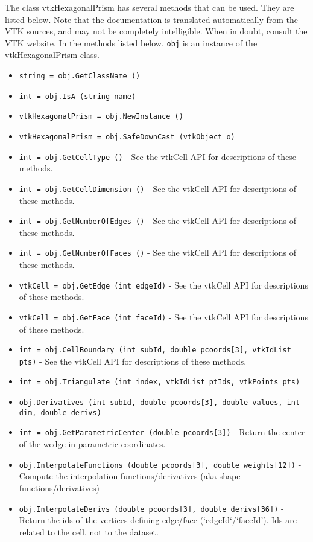 The class vtkHexagonalPrism has several methods that can be used.
  They are listed below.
Note that the documentation is translated automatically from the VTK sources,
and may not be completely intelligible.  When in doubt, consult the VTK website.
In the methods listed below, \verb|obj| is an instance of the vtkHexagonalPrism class.
\begin{itemize}
\item  \verb|string = obj.GetClassName ()|

\item  \verb|int = obj.IsA (string name)|

\item  \verb|vtkHexagonalPrism = obj.NewInstance ()|

\item  \verb|vtkHexagonalPrism = obj.SafeDownCast (vtkObject o)|

\item  \verb|int = obj.GetCellType ()| -  See the vtkCell API for descriptions of these methods.

\item  \verb|int = obj.GetCellDimension ()| -  See the vtkCell API for descriptions of these methods.

\item  \verb|int = obj.GetNumberOfEdges ()| -  See the vtkCell API for descriptions of these methods.

\item  \verb|int = obj.GetNumberOfFaces ()| -  See the vtkCell API for descriptions of these methods.

\item  \verb|vtkCell = obj.GetEdge (int edgeId)| -  See the vtkCell API for descriptions of these methods.

\item  \verb|vtkCell = obj.GetFace (int faceId)| -  See the vtkCell API for descriptions of these methods.

\item  \verb|int = obj.CellBoundary (int subId, double pcoords[3], vtkIdList pts)| -  See the vtkCell API for descriptions of these methods.

\item  \verb|int = obj.Triangulate (int index, vtkIdList ptIds, vtkPoints pts)|

\item  \verb|obj.Derivatives (int subId, double pcoords[3], double values, int dim, double derivs)|

\item  \verb|int = obj.GetParametricCenter (double pcoords[3])| -  Return the center of the wedge in parametric coordinates.

\item  \verb|obj.InterpolateFunctions (double pcoords[3], double weights[12])| -  Compute the interpolation functions/derivatives
 (aka shape functions/derivatives)

\item  \verb|obj.InterpolateDerivs (double pcoords[3], double derivs[36])| -  Return the ids of the vertices defining edge/face (`edgeId`/`faceId').
 Ids are related to the cell, not to the dataset.

\end{itemize}
